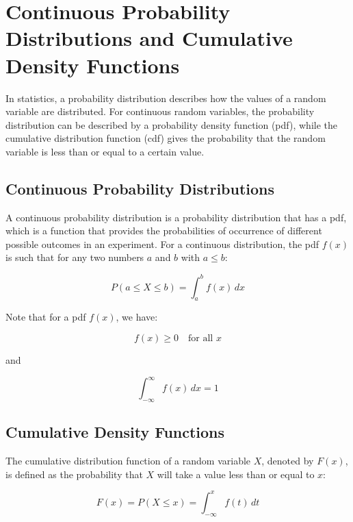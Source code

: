 \chapter{Continuous Probability Distributions and Cumulative Density Functions}

In statistics, a probability distribution describes how the values of a random variable are distributed. For continuous random variables, the probability distribution can be described by a probability density function (pdf), while the cumulative distribution function (cdf) gives the probability that the random variable is less than or equal to a certain value.

\section{Continuous Probability Distributions}

A continuous probability distribution is a probability distribution that has a pdf, which is a function that provides the probabilities of occurrence of different possible outcomes in an experiment. For a continuous distribution, the pdf $f(x)$ is such that for any two numbers $a$ and $b$ with $a \leq b$:

\begin{equation}
P(a \leq X \leq b) = \int_{a}^{b} f(x) \, dx
\end{equation}

Note that for a pdf $f(x)$, we have:

\begin{equation}
f(x) \geq 0 \quad \text{for all } x
\end{equation}

and

\begin{equation}
\int_{-\infty}^{\infty} f(x) \, dx = 1
\end{equation}

\section{Cumulative Density Functions}

The cumulative distribution function of a random variable $X$, denoted by $F(x)$, is defined as the probability that $X$ will take a value less than or equal to $x$:

\begin{equation}
F(x) = P(X \leq x) = \int_{-\infty}^{x} f(t) \, dt
\end{equation}

